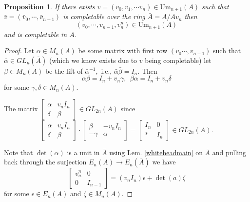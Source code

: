 \documentclass[12pt]{article}
\numberwithin{equation}{section}
\newcounter{dummy} \numberwithin{dummy}{section}
\newtheorem{proposition}[dummy]{Proposition}
\begin{document}
	
%	
	\begin{proposition} If there exists $v=(v_0, v_1, \cdots v_n) \in \mathrm{Um}_{n+1}(A)$ such that $\bar{v}=(\bar{v}_0, \cdots, \bar{v}_{n-1})$ is completable over the ring $\bar{A}=A/Av_n$ then $$(v_0,\cdots, v_{n-1} ,v_n^n) \in \mathrm{Um}_{n+1}(A)$$ and is completable in $A$.
		
	\end{proposition}
	\begin{proof}
		Let $\alpha \in M_{n}(A)$ be some matrix with first row $(v_0 \cdots, v_{n-1})$ such that $\bar{\alpha} \in GL_{n}(\bar{A})$ (which we know exists due to $v$ being completable) let $\beta \in M_{n}(A)$ be the lift of $\bar{\alpha}^{-1},$ i.e., $\bar{\alpha}\bar{\beta} = I_{n}$. Then $$\alpha \beta= I_n+v_n \gamma, \ \ \beta \alpha=I_n+v_n \delta$$ for some $\gamma,\delta \in M_{n}(A)$.
		
		The matrix $\begin{bmatrix}
			\alpha & v_n I_{n}\\
			\delta & \beta 
		\end{bmatrix} \in GL_{2n}(A)$ since $$\begin{bmatrix}
		\alpha & v_n I_n\\ \delta & \beta 
		\end{bmatrix} \cdot \begin{bmatrix}
		\beta & -v_n I_n \\ -\gamma & \alpha 
		\end{bmatrix} = \begin{bmatrix}
		I_n & 0 \\ * & I_n
		\end{bmatrix} \in GL_{2n}(A).$$ 
		
		Note that $\det(\alpha)$ is a unit in $\bar{A}$ using Lem. \ref{whiteheadmain} on $\bar{A}$ and pulling back through the surjection $E_n(A) \to E_n(\bar{A})$ we have $$\begin{bmatrix}
			v_n^n & 0 \\ 0 & I_{n-1}
		\end{bmatrix} = (v_n I_n) \epsilon + \det(a) \zeta $$ for some $\epsilon \in E_n(A)$ and $\zeta  \in M_n(A)$.
		

\end{proof}
\end{document}
